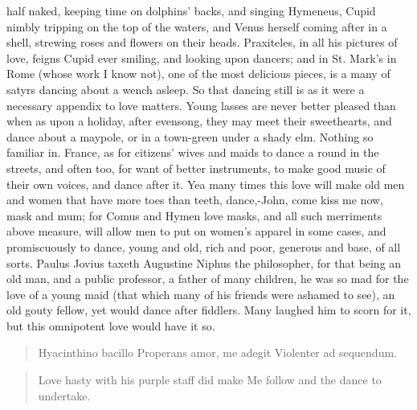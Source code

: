 half naked, keeping time on dolphins' backs, and singing Hymeneus,
Cupid nimbly tripping on the top of the waters, and Venus herself
coming after in a shell, strewing roses and flowers on their heads.
Praxiteles, in all his pictures of love, feigns Cupid ever smiling, and
looking upon dancers; and in St. Mark's in Rome (whose work I know
not), one of the most delicious pieces, is a many of satyrs
dancing about a wench asleep. So that dancing still is as it were a
necessary appendix to love matters. Young lasses are never better
pleased than when as upon a holiday, after evensong, they may meet
their sweethearts, and dance about a maypole, or in a town-green under
a shady elm. Nothing so familiar in. France, as for citizens'
wives and maids to dance a round in the streets, and often too, for
want of better instruments, to make good music of their own voices, and
dance after it. Yea many times this love will make old men and women
that have more toes than teeth, dance,-John, come kiss me now, mask and
mum; for Comus and Hymen love masks, and all such merriments above
measure, will allow men to put on women's apparel in some cases, and
promiscuously to dance, young and old, rich and poor, generous and
base, of all sorts. Paulus Jovius taxeth Augustine Niphus the
philosopher, for that being an old man, and a public professor, a
father of many children, he was so mad for the love of a young maid
(that which many of his friends were ashamed to see), an old gouty
fellow, yet would dance after fiddlers. Many laughed him to scorn for
it, but this omnipotent love would have it so.

\begin{latin}
\begin{verse}
Hyacinthino bacillo
Properans amor, me adegit
Violenter ad sequendum.
\end{verse}
\end{latin}
\translationrule%
\begin{verse}%
Love hasty with his purple staff did make
Me follow and the dance to undertake.
\end{verse}%

